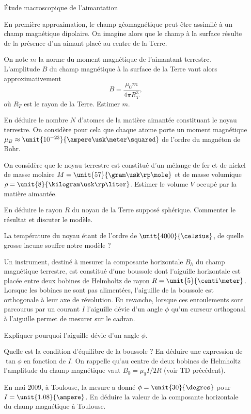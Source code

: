 \begin{td}{Étude macroscopique de l'aimantation}

	En première approximation, le champ géomagnétique peut-être assimilé
	à un champ magnétique dipolaire. On imagine alors que le champ à la surface
	résulte de la présence d'un aimant placé au centre de la Terre.
	\begin{exlist}
		\item On note $m$ la norme du moment magnétique de l'aimantant terrestre. 
		L'amplitude $B$ du champ magnétique à la surface de la Terre 
		vaut alors approximativement
		\begin{equation*}
			B = \dfrac{\mu_0 m}{4 \pi R_T^3},
		\end{equation*}
		où $R_T$ est le rayon de la Terre. Estimer $m$.
	\item En déduire le nombre $N$ d'atomes de la matière aimantée constituant le noyau
	  terrestre. On considère pour cela que chaque atome porte un moment
	  magnétique $\mu_B \approx \unit{10^{-23}}{\ampere \usk \meter \squared}$ 
	  de l'ordre du magnéton de Bohr.
	\item On considère que le noyau terrestre est constitué d'un mélange de fer
	  et de nickel de masse molaire $M = \unit{57}{\gram \usk \rp \mole}$
	  et de masse volumique $\rho = \unit{8}{\kilogram \usk \rp \liter}$.
	  Estimer le volume $V$ occupé par la matière aimantée.
	\item En déduire le rayon $R$ du noyau de la Terre supposé sphérique.
	  Commenter le résultat et discuter le modèle. 
	\item La température du noyau étant de l'ordre de $\unit{4000}{\celsius}$,
	  de quelle grosse lacune souffre notre modèle ?
	  
	\end{exlist}


	Un instrument, destiné à mesurer la composante horizontale $B_h$
	du champ magnétique
	terrestre, est constitué d'une boussole dont l'aiguille horizontale est 
	placée entre deux bobines de Helmholtz de rayon $R = \unit{5}{\centi \meter}$. 
	Lorsque les bobines ne sont pas alimentées, l'aiguille de la boussole 
	est orthogonale à leur axe de révolution.
	En revanche, lorsque ces enroulements
	sont parcourus par un courant $I$ l'aiguille dévie d'un angle $\phi$
	qu'un curseur orthogonal à l'aiguille permet de mesurer sur le cadran.
	\begin{exlist}
	  \item Expliquer pourquoi l'aiguille dévie d'un angle $\phi$.
    	  \item Quelle est la condition d'équilibre de la boussole ? 
	    En déduire une expression de $\tan \phi$ en fonction de $I$.
	    On rappelle qu'au centre de deux bobines de Helmholtz l'amplitude du champ 
	    magnétique vaut $B_0 = \mu_0 I/2R$ (voir TD précédent).
	  \item En mai 2009, à Toulouse, la mesure a donné $\phi = \unit{30}{\degres}$
	    pour $I = \unit{1.08}{\ampere}$. En déduire la valeur de
	    la composante horizontale du champ magnétique à Toulouse. 
	\end{exlist}



\end{td}
